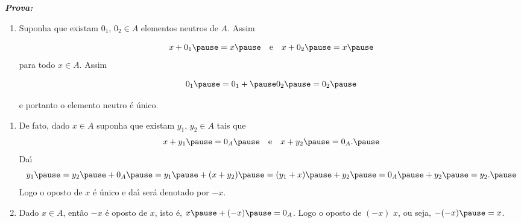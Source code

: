 \documentclass{beamer}
\begin{document}
    \begin{frame}
        \noindent \textbf{\textit{Prova:} }\pause
        \begin{enumerate}[label={\roman*})]
            \item Suponha que existam $0_1$, \pause $0_2\in A$ \pause elementos neutros \pause de $A$. \pause Assim\pause
                
            \[
                x + 0_1 \pause = x\pause \quad \mbox{e}\quad x + 0_2 \pause = x\pause
            \]
            para todo $x \in A$. \pause Assim\pause

            \[
                   0_1 \pause = 0_1 +\pause 0_2 \pause = 0_2\pause
            \]
            
            e portanto o elemento neutro \'e \'unico.\pause
                
            \vspace{.5cm}

            \seti
        \end{enumerate}
    \end{frame}

    \begin{frame}
        \begin{enumerate}[label={\roman*})]
            \conti

            \item De fato, \pause dado $x \in A$ \pause suponha que existam $y_1$, \pause $y_2\in A$ \pause tais que\pause
            \[
                x + y_1 \pause = 0_A \pause \quad \mbox{e}\quad x + y_2 \pause = 0_A.\pause
            \]
            Da{\'\i}\pause
            \[
                y_1 \pause = y_2 \pause + 0_A \pause = y_1 \pause + (x + y_2) \pause = (y_1 + x) \pause + y_2 \pause = 0_A\pause  + y_2 \pause= y_2.\pause
            \]
            Logo o oposto de $x$ \'e \'unico \pause e da{\'\i} ser\'a denotado por $-x$.\pause
                
            \vspace{.5cm}

            \item Dado $x \in A$, \pause ent\~ao $-x$ {\'e} oposto de $x$, \pause isto {\'e}, \pause $x \pause + (-x) \pause = 0_A$. \pause Logo o oposto de $(-x)$  $x$, \pause ou seja, \pause $-(-x) \pause = x$.\pause
            
            \seti
        \end{enumerate}
    \end{frame}
\end{document}
